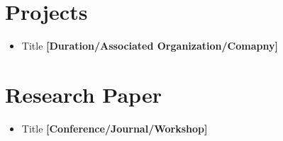 \documentclass{article}
\begin{document}
    
    \section{Projects}
        \begin{itemize}
            \item Title \textbf{[Duration/Associated Organization/Comapny] }
            
        \end{itemize}
        
    \section{Research Paper}
        \begin{itemize}
            \item Title \textbf{[Conference/Journal/Workshop]}
        \end{itemize}
        
\end{document}
